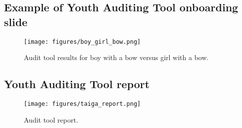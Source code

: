 \newpage
\subsection{Example of Youth Auditing Tool onboarding slide}
\label{appendix_toolOnboarding}
\begin{figure} [h!]
    \centering
    \texttt{[image: figures/boy\_girl\_bow.png]}
    \caption{Audit tool results for boy with a bow versus girl with a bow.}
    \label{fig:toolresult2}
\end{figure}

\newpage
\subsection{Youth Auditing Tool report}
\label{appendix_toolReport}
\begin{figure}[htbp]
    \centering
    \texttt{[image: figures/taiga\_report.png]}
    \caption{Audit tool report.}
    \label{fig:tool}
\end{figure}